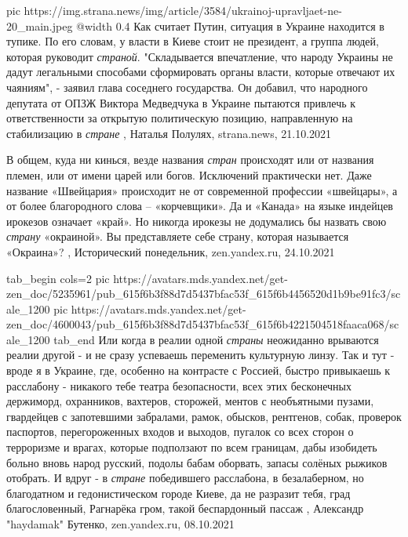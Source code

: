 \ifcmt
  pic https://img.strana.news/img/article/3584/ukrainoj-upravljaet-ne-20_main.jpeg
  @width 0.4
\fi
Как считает Путин, ситуация в Украине находится в тупике. По его словам, у
власти в Киеве стоит не президент, а группа людей, которая руководит \emph{страной}.
"Складывается впечатление, что народу Украины не дадут легальными способами
сформировать органы власти, которые отвечают их чаяниям", - заявил глава
соседнего государства.  Он добавил, что народного депутата от ОПЗЖ Виктора
Медведчука в Украине пытаются привлечь к ответственности за открытую
политическую позицию, направленную на стабилизацию в \emph{стране}
, 
Наталья Полулях, strana.news, 21.10.2021

В общем, куда ни кинься, везде названия \emph{стран} происходят или от названия
племен, или от имени царей или богов. Исключений практически нет. Даже название
«Швейцария» происходит не от современной профессии «швейцары», а от более
благородного слова – «корчевщики». Да и «Канада» на языке индейцев ирокезов
означает «край». Но никогда ирокезы не додумались бы назвать свою \emph{страну}
«окраиной».  Вы представляете себе страну, которая называется «Окраина»?
, 
Исторический понедельник, zen.yandex.ru, 24.10.2021

\ifcmt
  tab_begin cols=2
     pic https://avatars.mds.yandex.net/get-zen_doc/5235961/pub_615f6b3f88d7d5437bfac53f_615f6b4456520d1b9be91fc3/scale_1200
     pic https://avatars.mds.yandex.net/get-zen_doc/4600043/pub_615f6b3f88d7d5437bfac53f_615f6b4221504518faaca068/scale_1200
  tab_end
\fi
Или когда в реалии одной \emph{страны} неожиданно врываются реалии другой - и
не сразу успеваешь переменить культурную линзу.  Так и тут - вроде я в Украине,
где, особенно на контрасте с Россией, быстро привыкаешь к расслабону - никакого
тебе театра безопасности, всех этих бесконечных держиморд, охранников,
вахтеров, сторожей, ментов с необъятными пузами, гвардейцев с запотевшими
забралами, рамок, обысков, рентгенов, собак, проверок паспортов, перегороженных
входов и выходов, пугалок со всех сторон о терроризме и врагах, которые
подползают по всем границам, дабы изобидеть больно вновь народ русский, подолы
бабам оборвать, запасы солёных рыжиков отобрать.  И вдруг - в \emph{стране}
победившего расслабона, в безалаберном, но благодатном и гедонистическом городе
Киеве, да не разразит тебя, град благословенный, Рагнарёка гром, такой
беспардонный пассаж
, 
Александр "haydamak" Бутенко, zen.yandex.ru, 08.10.2021

